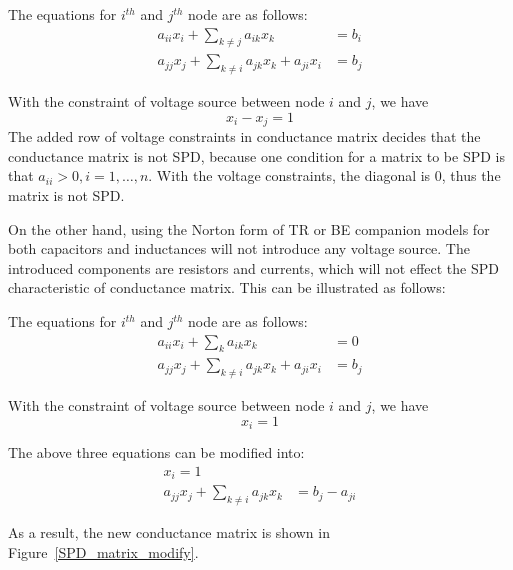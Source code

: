 The equations for $i^{th}$ and $j^{th}$ node are as follows:
\begin{align}
	a_{ii}x_i+\sum\limits_{k\neq j}a_{ik}x_k &= b_i\\
	a_{jj}x_j+\sum\limits_{k\neq i}a_{jk}x_k+a_{ji}x_i&=b_j \label{v_express}
\end{align}

With the constraint of voltage source between node $i$ and $j$, we have
\begin{equation}
	x_i-x_j=1 \label{v_con}
\end{equation}
The added row of voltage constraints in conductance matrix decides that the conductance matrix is not SPD, because one condition for a matrix 
to be SPD is that $a_{ii}>0, i=1,\dots, n$. With the voltage constraints, the diagonal is 0, thus the matrix is not SPD.

On the other hand, using the Norton form of TR or BE companion models for both capacitors and inductances will not introduce any 
voltage source. The introduced components are resistors and currents, which will not effect the SPD characteristic of conductance matrix. This can be illustrated as follows:

The equations for $i^{th}$ and $j^{th}$ node are as follows:
\begin{align}
	a_{ii}x_i+\sum\limits_{k}a_{ik}x_k &= 0\\
	a_{jj}x_j+\sum\limits_{k\neq i}a_{jk}x_k+a_{ji}x_i&=b_j
\end{align}

With the constraint of voltage source between node $i$ and $j$, we have
\begin{equation}
	x_i=1
\end{equation} 

The above three equations can be modified into:
\begin{align}
	x_i=1\\
	a_{jj}x_j+\sum\limits_{k\neq i}a_{jk}x_k&=b_j-a_{ji} \label{v_express_prime}
\end{align}
 
As a result, the new conductance matrix is shown in Figure~\ref{SPD_matrix_modify}.


